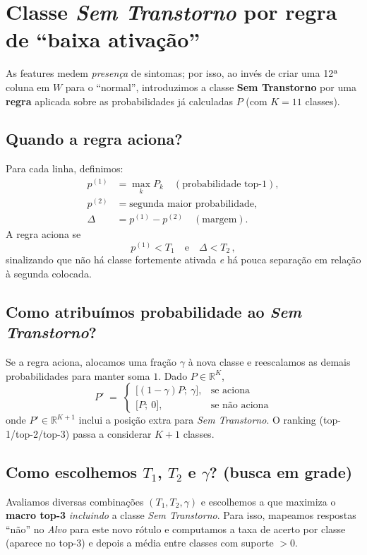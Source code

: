 \documentclass[11pt,a4paper]{article}
\begin{document}
\section{Classe \textit{Sem Transtorno} por regra de ``baixa ativação''}
As features medem \emph{presença} de sintomas; por isso, ao invés de criar uma 12ª coluna em $W$ para o ``normal'', introduzimos a classe \textbf{Sem Transtorno} por uma \textbf{regra} aplicada sobre as probabilidades já calculadas $P$ (com $K=11$ classes).

\subsection*{Quando a regra aciona?}
Para cada linha, definimos:
\begin{align}
  p^{(1)} &= \max_k P_k \quad (\text{probabilidade top-1}),\\
  p^{(2)} &= \text{segunda maior probabilidade},\\
  \Delta  &= p^{(1)} - p^{(2)} \quad (\text{margem}).
\end{align}
A regra aciona se
\begin{equation}
  p^{(1)} < T_1 \quad \text{e} \quad \Delta < T_2 \,,
\end{equation}
sinalizando que não há classe fortemente ativada \emph{e} há pouca separação em relação à segunda colocada.

\subsection*{Como atribuímos probabilidade ao \textit{Sem Transtorno}?}
Se a regra aciona, alocamos uma fração $\gamma$ à nova classe e reescalamos as demais probabilidades para manter soma $1$.
Dado $P\in\mathbb{R}^K$,
\begin{equation}
  P' \;=\;
  \begin{cases}
    \big[(1-\gamma)P;\ \gamma\big], & \text{se aciona}\\[2pt]
    \big[P;\ 0\big], & \text{se não aciona}
  \end{cases}
\end{equation}
onde $P' \in \mathbb{R}^{K+1}$ inclui a posição extra para \emph{Sem Transtorno}.
O ranking (top-1/top-2/top-3) passa a considerar $K{+}1$ classes.

\subsection*{Como escolhemos $T_1$, $T_2$ e $\gamma$? (busca em grade)}
Avaliamos diversas combinações $(T_1,T_2,\gamma)$ e escolhemos a que maximiza o \textbf{macro top-3} \emph{incluindo} a classe \emph{Sem Transtorno}.
Para isso, mapeamos respostas ``não'' no \emph{Alvo} para este novo rótulo e computamos a taxa de acerto por classe (aparece no top-3) e depois a média entre classes com suporte $>0$.
\end{document}
